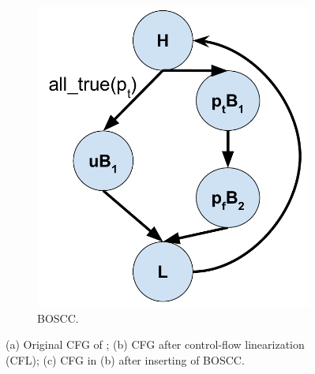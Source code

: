 \begin{figure}
\begin{subfigure}[b]{0.3225\columnwidth}
         \includegraphics[height=0.17\textheight]{Figures/02-background/simple-loop-bossc-cfg.pdf}
         \caption{BOSCC.}
         \label{fig:simple-loop-boscc-cfg}
     \end{subfigure}
        \caption{(a) Original CFG of ; (b) CFG after control-flow linearization (CFL); (c) CFG in (b) after inserting of  BOSCC.}
        \label{fig:simple-loop-cfgs}
\end{figure}

